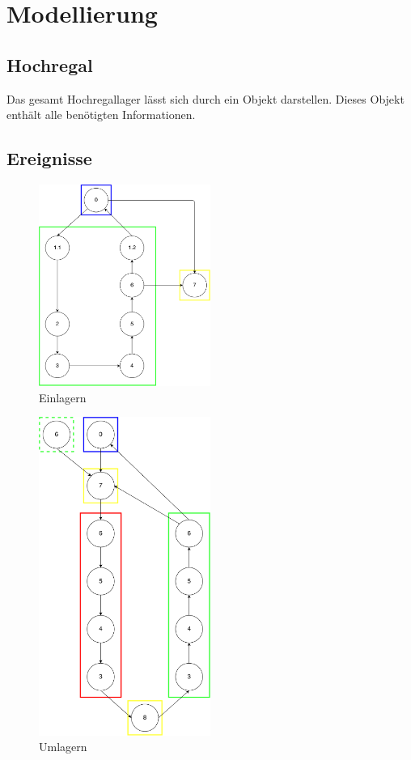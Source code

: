 \section{Modellierung}


\subsection{Hochregal}
Das gesamt Hochregallager lässt sich durch ein Objekt darstellen. Dieses Objekt enthält alle benötigten Informationen.



%
\subsection{Ereignisse}

\begin{figure}[h]
  \begin{center}
    \includegraphics[width=0.5\textwidth]{images/einlagern.png}
    \caption{Einlagern}
    \label{fig:in}
  \end{center}
\end{figure}
%
\begin{figure}[h]
  \begin{center}
    \includegraphics[width=0.5\textwidth]{images/umlagern.png}
    \caption{Umlagern}
    \label{fig:move}
  \end{center}
\end{figure}
